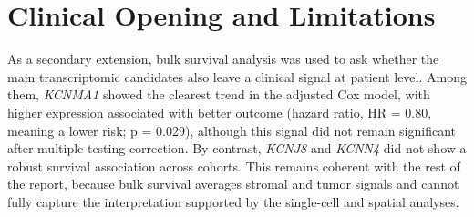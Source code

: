 \documentclass[11pt,a4paper]{article}
\begin{document}
\section*{Clinical Opening and Limitations}
As a secondary extension, bulk survival analysis was used to ask whether the main transcriptomic candidates also leave a clinical signal at patient level. Among them, \textit{KCNMA1} showed the clearest trend in the adjusted Cox model, with higher expression associated with better outcome (hazard ratio, HR = 0.80, meaning a lower risk; p = 0.029), although this signal did not remain significant after multiple-testing correction. By contrast, \textit{KCNJ8} and \textit{KCNN4} did not show a robust survival association across cohorts. This remains coherent with the rest of the report, because bulk survival averages stromal and tumor signals and cannot fully capture the interpretation supported by the single-cell and spatial analyses.
\end{document}
